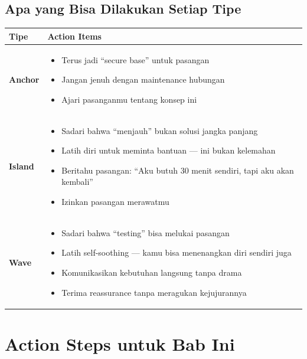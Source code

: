 \subsection{Apa yang Bisa Dilakukan Setiap Tipe}

\begin{center}
\renewcommand{\arraystretch}{1.4}
\begin{tabular}{|>{\raggedright}p{3cm}|>{\raggedright\arraybackslash}p{12cm}|}
\hline
\rowcolor{primary!20}
\textbf{Tipe} & \textbf{Action Items} \\
\hline
\textbf{Anchor} & 
\begin{itemize}[leftmargin=*, itemsep=0.1cm]
    \item Terus jadi ``secure base'' untuk pasangan
    \item Jangan jenuh dengan maintenance hubungan
    \item Ajari pasanganmu tentang konsep ini
\end{itemize} \\
\hline
\textbf{Island} & 
\begin{itemize}[leftmargin=*, itemsep=0.1cm]
    \item Sadari bahwa ``menjauh'' bukan solusi jangka panjang
    \item Latih diri untuk meminta bantuan --- ini bukan kelemahan
    \item Beritahu pasangan: ``Aku butuh 30 menit sendiri, tapi aku akan kembali''
    \item Izinkan pasangan merawatmu
\end{itemize} \\
\hline
\textbf{Wave} & 
\begin{itemize}[leftmargin=*, itemsep=0.1cm]
    \item Sadari bahwa ``testing'' bisa melukai pasangan
    \item Latih self-soothing --- kamu bisa menenangkan diri sendiri juga
    \item Komunikasikan kebutuhan langsung tanpa drama
    \item Terima reassurance tanpa meragukan kejujurannya
\end{itemize} \\
\hline
\end{tabular}
\end{center}

\section{Action Steps untuk Bab Ini}


